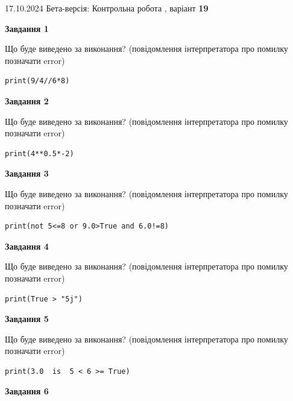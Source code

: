 \documentclass[12pt, ukrainian]{article}
\begin{document}
{\Large{17.10.2024 Бета-версія: Контрольна робота , варіант  \No \textbf { 19 }\par}}
{
\begin {large}
{\begin {center}\textbf{Завдання 1}\end {center}}

Що буде виведено за виконання? (повідомлення інтерпретатора про помилку позначати error)\par
\begin{verbatim}
print(9/4//6*8)
\end{verbatim}

{\begin {center}\textbf{Завдання 2}\end {center}}

Що буде виведено за виконання? (повідомлення інтерпретатора про помилку позначати error)\par
\begin{verbatim}
print(4**0.5*-2)
\end{verbatim}

{\begin {center}\textbf{Завдання 3}\end {center}}

Що буде виведено за виконання? (повідомлення інтерпретатора про помилку позначати error)\par
\begin{verbatim}
print(not 5<=8 or 9.0>True and 6.0!=8)
\end{verbatim}

{\begin {center}\textbf{Завдання 4}\end {center}}

Що буде виведено за виконання? (повідомлення інтерпретатора про помилку позначати error)\par
\begin{verbatim}
print(True > "5j")
\end{verbatim}

{\begin {center}\textbf{Завдання 5}\end {center}}

Що буде виведено за виконання? (повідомлення інтерпретатора про помилку позначати error)\par
\begin{verbatim}
print(3.0  is  5 < 6 >= True)
\end{verbatim}

{\begin {center}\textbf{Завдання 6}\end {center}}


\end{large}}
\end{document}
